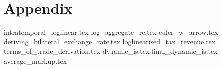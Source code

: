 \section{Appendix}
\appendix 
\renewcommand{\theequation}{A.\arabic{equation}}
{intratemporal_loglinear.tex}
{log_aggregate_rc.tex}
{euler_w_arrow.tex}
{deriving_bilateral_exchange_rate.tex}
{loglinearised_tax_revenue.tex}
{terms_of_trade_derivation.tex}
{dynamic_is.tex}
{final_dynamic_is.tex}
{average_markup.tex}
